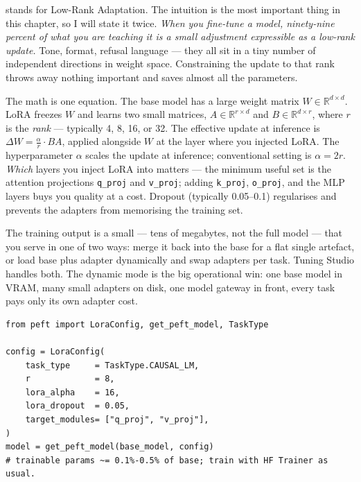  stands for Low-Rank Adaptation. The intuition is the most important thing in this chapter, so I will state it twice. \emph{When you fine-tune a model, ninety-nine percent of what you are teaching it is a small adjustment expressible as a low-rank update.} Tone, format, refusal language --- they all sit in a tiny number of independent directions in weight space. Constraining the update to that rank throws away nothing important and saves almost all the parameters.

The math is one equation. The base model has a large weight matrix $W \in \mathbb{R}^{d \times d}$. LoRA freezes $W$ and learns two small matrices, $A \in \mathbb{R}^{r \times d}$ and $B \in \mathbb{R}^{d \times r}$, where $r$ is the \emph{rank} --- typically 4, 8, 16, or 32. The effective update at inference is $\Delta W = \frac{\alpha}{r} \cdot B A$, applied alongside $W$ at the layer where you injected LoRA. The hyperparameter $\alpha$ scales the update at inference; conventional setting is $\alpha = 2r$. \emph{Which} layers you inject LoRA into matters --- the minimum useful set is the attention projections \texttt{q\_proj} and \texttt{v\_proj}; adding \texttt{k\_proj}, \texttt{o\_proj}, and the MLP layers buys you quality at a cost. Dropout (typically 0.05--0.1) regularises and prevents the adapters from memorising the training set.

The training output is a small  --- tens of megabytes, not the full model --- that you serve in one of two ways: merge it back into the base for a flat single artefact, or load base plus adapter dynamically and swap adapters per task. Tuning Studio handles both. The dynamic mode is the big operational win: one base model in VRAM, many small adapters on disk, one model gateway in front, every task pays only its own adapter cost.

\begin{examplebox}[title=\textbf{Conceptual LoRA training loop (PEFT library)}]
\begin{lstlisting}[style=pythonstyle]
from peft import LoraConfig, get_peft_model, TaskType

config = LoraConfig(
    task_type     = TaskType.CAUSAL_LM,
    r             = 8,
    lora_alpha    = 16,
    lora_dropout  = 0.05,
    target_modules= ["q_proj", "v_proj"],
)
model = get_peft_model(base_model, config)
# trainable params ~= 0.1%-0.5% of base; train with HF Trainer as usual.
\end{lstlisting}
\end{examplebox}

